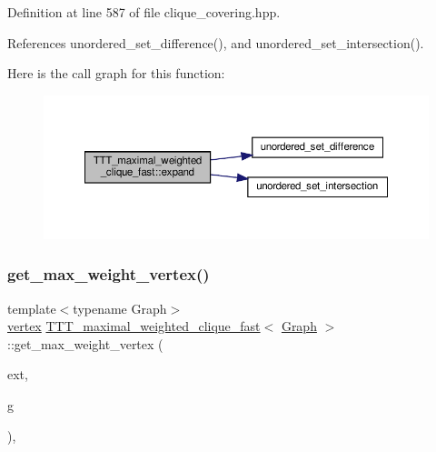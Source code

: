 Definition at line 587 of file clique\+\_\+covering.\+hpp.



References unordered\+\_\+set\+\_\+difference(), and unordered\+\_\+set\+\_\+intersection().

Here is the call graph for this function\+:
\nopagebreak
\begin{figure}[H]
\begin{center}
\leavevmode
\includegraphics[width=350pt]{d4/d7c/classTTT__maximal__weighted__clique__fast_afa776883f9aeaca8194a842c8b333fc4_cgraph}
\end{center}
\end{figure}
\mbox{\label{classTTT__maximal__weighted__clique__fast_a00b40c60402642712549140c217840f2}} 
\subsubsection{\texorpdfstring{get\+\_\+max\+\_\+weight\+\_\+vertex()}{get\_max\_weight\_vertex()}}
{\footnotesize\ttfamily template$<$typename Graph$>$ \\
\hyperlink{classTTT__maximal__weighted__clique__fast_a55ca1f8931415f7338827925b86c218d}{vertex} \hyperlink{classTTT__maximal__weighted__clique__fast}{T\+T\+T\+\_\+maximal\+\_\+weighted\+\_\+clique\+\_\+fast}$<$ \hyperlink{structGraph}{Graph} $>$\+::get\+\_\+max\+\_\+weight\+\_\+vertex (\begin{DoxyParamCaption}\item[{\hyperlink{classCustomUnorderedSet}{Custom\+Unordered\+Set}$<$ \hyperlink{classTTT__maximal__weighted__clique__fast_a55ca1f8931415f7338827925b86c218d}{vertex} $>$ \&}]{ext,  }\item[{const \hyperlink{structGraph}{Graph} \&}]{g }\end{DoxyParamCaption})\hspace{0.3cm}{\ttfamily [inline]}, {\ttfamily [private]}}



